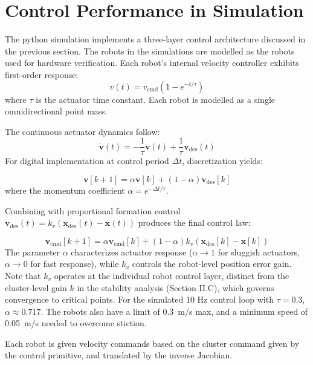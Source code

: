 \documentclass[lettersize,journal]{IEEEtran}
\begin{document}
\section{Control Performance in Simulation}

\noindent The python simulation implements a three-layer control architecture discussed in the previous section. The robots in the simulations are modelled as the robots used for hardware verification. Each robot's internal velocity controller exhibits first-order response:
\begin{equation}
v(t) = v_{\text{cmd}}(1 - e^{-t/\tau})
\end{equation}
where
$\tau$ is the actuator time constant. Each robot is modelled as a single omnidirectional point mass.

The continuous actuator dynamics follow:
\begin{equation}
\dot{\mathbf{v}}(t) = -\frac{1}{\tau}\mathbf{v}(t) + \frac{1}{\tau}\mathbf{v}_{\text{des}}(t)
\label{eq:continuous}
\end{equation}
For digital implementation at control period $\Delta t$, discretization yields:

\begin{equation}
\mathbf{v}[k+1] = \alpha \mathbf{v}[k] + (1-\alpha)\mathbf{v}_{\text{des}}[k]
\label{eq:momentum}
\end{equation}
where the momentum coefficient
$\alpha = e^{-\Delta t/\tau}$. 

Combining with proportional formation control $\mathbf{v}_{\text{des}}(t) = k_v(\mathbf{x}_{\text{des}}(t) - \mathbf{x}(t))$ produces the final control law:

\begin{equation}
\mathbf{v}_{\text{cmd}}[k+1] = \alpha \mathbf{v}_{\text{cmd}}[k] + (1-\alpha)k_v(\mathbf{x}_{\text{des}}[k] - \mathbf{x}[k])
\label{eq:final}
\end{equation}
The parameter $\alpha$ characterizes actuator response ($\alpha \to 1$ for sluggish actuators, $\alpha \to 0$ for fast response), while $k_v$ controls the robot-level position error gain. Note that $k_v$ operates at the individual robot control layer, distinct from the cluster-level gain $k$ in the stability analysis (Section II.C), which governs convergence to critical points. For the simulated 10 Hz control loop with $\tau = 0.3$, $\alpha \approx 0.717$. The robots also have a limit of 0.3~m/s max, and a minimum speed of 0.05~m/s needed to overcome stiction.

Each robot is given velocity commands based on the cluster command given by the control primitive, and translated by the inverse Jacobian. 
\end{document}
